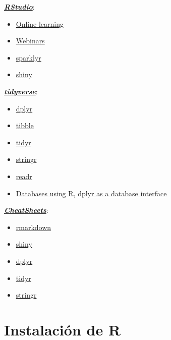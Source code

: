 \documentclass[]{book}
\begin{document}
\href{https://www.rstudio.com}{\textbf{\emph{RStudio}}}:

\begin{itemize}
\item
  \href{https://www.rstudio.com/online-learning}{Online learning}
\item
  \href{https://resources.rstudio.com/webinars}{Webinars}
\item
  \href{https://spark.rstudio.com/}{sparklyr}
\item
  \href{http://shiny.rstudio.com}{shiny}
\end{itemize}

\href{https://www.tidyverse.org/}{\textbf{\emph{tidyverse}}}:

\begin{itemize}
\item
  \href{https://dplyr.tidyverse.org}{dplyr}
\item
  \href{https://tibble.tidyverse.org}{tibble}
\item
  \href{https://tidyr.tidyverse.org}{tidyr}
\item
  \href{https://stringr.tidyverse.org}{stringr}
\item
  \href{https://readr.tidyverse.org}{readr}
\item
  \href{https://db.rstudio.com}{Databases using R},
  \href{https://db.rstudio.com/overview}{dplyr as a database interface}
\end{itemize}

\href{https://resources.rstudio.com/rstudio-cheatsheets}{\textbf{\emph{CheatSheets}}}:

\begin{itemize}
\item
  \href{https://resources.rstudio.com/rstudio-cheatsheets/rmarkdown-2-0-cheat-sheet}{rmarkdown}
\item
  \href{https://resources.rstudio.com/rstudio-cheatsheets/shiny-cheat-sheet}{shiny}
\item
  \href{https://github.com/rstudio/cheatsheets/blob/master/data-transformation.pdf}{dplyr}
\item
  \href{https://github.com/rstudio/cheatsheets/blob/master/data-import.pdf}{tidyr}
\item
  \href{https://resources.rstudio.com/rstudio-cheatsheets/stringr-cheat-sheet}{stringr}
\end{itemize}

\hypertarget{instalacion}{%
\chapter{Instalación de R}\label{instalacion}}
\end{document}
